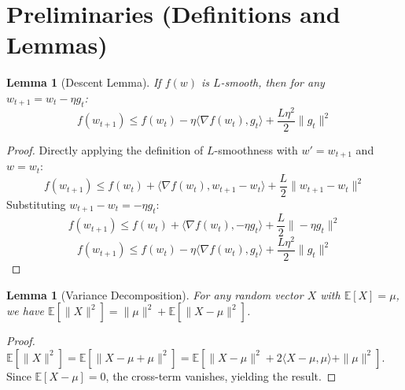 \documentclass{article}
\newtheorem{lemma}[theorem]{Lemma}
\begin{document}
\section*{Preliminaries (Definitions and Lemmas)}
\begin{lemma}[Descent Lemma]
If $f(w)$ is $L$-smooth, then for any $w_{t+1} = w_t - \eta g_t$:
$$f(w_{t+1}) \leq f(w_t) - \eta \langle \nabla f(w_t), g_t \rangle + \frac{L \eta^2}{2} \|g_t\|^2$$
\end{lemma}
\begin{proof}
Directly applying the definition of $L$-smoothness with $w' = w_{t+1}$ and $w = w_t$:
$$f(w_{t+1}) \leq f(w_t) + \langle \nabla f(w_t), w_{t+1} - w_t \rangle + \frac{L}{2} \|w_{t+1} - w_t\|^2$$
Substituting $w_{t+1} - w_t = -\eta g_t$:
$$f(w_{t+1}) \leq f(w_t) + \langle \nabla f(w_t), -\eta g_t \rangle + \frac{L}{2} \|-\eta g_t\|^2$$
$$f(w_{t+1}) \leq f(w_t) - \eta \langle \nabla f(w_t), g_t \rangle + \frac{L \eta^2}{2} \|g_t\|^2$$
\end{proof}

\begin{lemma}[Variance Decomposition]
For any random vector $X$ with $\mathbb{E}[X] = \mu$, we have $\mathbb{E}[\|X\|^2] = \|\mu\|^2 + \mathbb{E}[\|X - \mu\|^2]$.
\end{lemma}
\begin{proof}
$\mathbb{E}[\|X\|^2] = \mathbb{E}[\|X - \mu + \mu\|^2] = \mathbb{E}[\|X - \mu\|^2 + 2\langle X - \mu, \mu \rangle + \|\mu\|^2]$. Since $\mathbb{E}[X - \mu] = 0$, the cross-term vanishes, yielding the result.
\end{proof}
\end{document}
